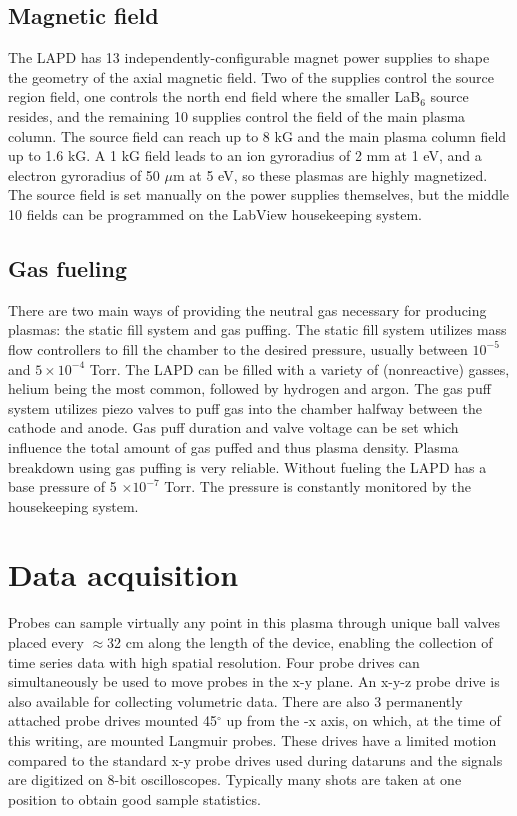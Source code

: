 \subsection{Magnetic field}
The LAPD has 13 independently-configurable magnet power supplies to shape the geometry of the axial magnetic field. Two of the supplies control the source region field, one controls the north end field where the smaller LaB$_6$ source resides, and the remaining 10 supplies control the field of the main plasma column. The source field can reach up to 8 kG and the main plasma column field up to 1.6 kG. A 1 kG field leads to an ion gyroradius of 2 mm at 1 eV, and a electron gyroradius of 50 $\mu$m at 5 eV, so these plasmas are highly magnetized. The source field is set manually on the power supplies themselves, but the middle 10 fields can be programmed on the LabView housekeeping system.

\subsection{Gas fueling}
There are two main ways of providing the neutral gas necessary for producing plasmas: the static fill system and gas puffing. The static fill system utilizes mass flow controllers to fill the chamber to the desired pressure, usually between $10^{-5}$ and $5 \times 10^{-4}$ Torr. The LAPD can be filled with a variety of (nonreactive) gasses, helium being the most common, followed by hydrogen and argon. The gas puff system utilizes piezo valves to puff gas into the chamber halfway between the cathode and anode. Gas puff duration and valve voltage can be set which influence the total amount of gas puffed and thus plasma density. Plasma  breakdown using gas puffing is very reliable. Without fueling the LAPD has a base pressure of 5 $\times 10^{-7}$ Torr. The pressure is constantly monitored by the housekeeping system. 

\section{Data acquisition}

Probes can sample virtually any point in this plasma through unique ball valves placed every $\approx$32 cm along the length of the device, enabling the collection of time series data with high spatial resolution. Four probe drives can simultaneously be used to move probes in the x-y plane. An x-y-z probe drive is also available for collecting volumetric data. There are also 3 permanently attached probe drives mounted 45$^\circ$ up from the -x axis, on which, at the time of this writing, are mounted Langmuir probes. These drives have a limited motion compared to the standard x-y probe drives used during dataruns and the signals are digitized on 8-bit oscilloscopes. Typically many shots are taken at one position to obtain good sample statistics.

